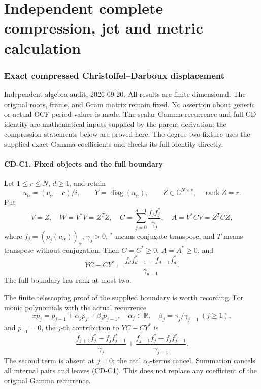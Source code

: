 \endgroup

\clearpage\begingroup
\part*{Independent complete compression, jet and metric calculation}
\providecommand{\cdaudittightlist}{\setlength{\itemsep}{0pt}\setlength{\parskip}{0pt}}

\section{Exact compressed Christoffel--Darboux displacement}\label{cdaudit:exact-compressed-christoffeldarboux-displacement}

Independent algebra audit, 2026-09-20. All results are finite-dimensional. The original roots, frame, and Gram matrix remain fixed. No assertion about generic or actual OCF period values is made. The scalar Gamma recurrence and full CD identity are mathematical inputs supplied by the parent derivation; the compression statements below are proved here. The degree-two fixture uses the supplied exact Gamma coefficients and checks its full identity directly.

\subsection{CD-C1. Fixed objects and the full boundary}\label{cdaudit:cd-c1.-fixed-objects-and-the-full-boundary}

Let \(1\le r\le N\), \(d\ge1\), and retain \[
u_\alpha=(v_\alpha-c)/i,\qquad Y=\operatorname{diag}(u_\alpha),\qquad
Z\in\mathbb C^{N\times r},\quad \operatorname{rank}Z=r.
\] Put \[
V=\overline Z,\quad W=V^*V=Z^T\overline Z,\quad
C=\sum_{j=0}^{d-1}\frac{f_jf_j^*}{\gamma_j},\quad
A=V^*CV=Z^TC\overline Z,
\] where \(f_j=(p_j(u_\alpha))_\alpha\), \(\gamma_j>0\), \(^{*}\) means conjugate transpose, and \(T\) means transpose without conjugation. Then \(C=C^*\ge0\), \(A=A^*\ge0\), and \[
YC-CY^*=\frac{f_df_{d-1}^*-f_{d-1}f_d^*}{\gamma_{d-1}}.
\tag{CD-C1}
\] The full boundary has rank at most two.

The finite telescoping proof of the supplied boundary is worth recording. For monic polynomials with the actual recurrence \[
xp_j=p_{j+1}+\alpha_jp_j+\beta_jp_{j-1},\quad
\alpha_j\in\mathbb R,\quad \beta_j=\gamma_j/\gamma_{j-1}\ (j\ge1),
\] and \(p_{-1}=0\), the \(j\)-th contribution to \(YC-CY^*\) is \[
\frac{f_{j+1}f_j^*-f_jf_{j+1}^*}{\gamma_j}
+\frac{f_{j-1}f_j^*-f_jf_{j-1}^*}{\gamma_{j-1}}.
\] The second term is absent at \(j=0\); the real \(\alpha_j\)-terms cancel. Summation cancels all internal pairs and leaves (CD-C1). This does not replace any coefficient of the original Gamma recurrence.

